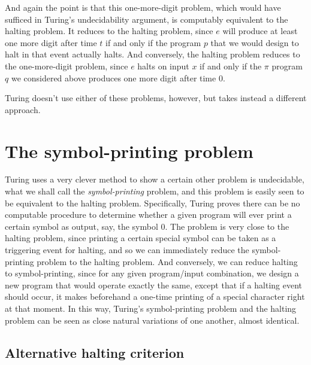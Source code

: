 \documentclass[12pt]{amsart}
\begin{document}
And again the point is that this one-more-digit problem, which would have sufficed in Turing's undecidability argument, is computably equivalent to the halting problem. It reduces to the halting problem, since $e$ will produce at least one more digit after time $t$ if and only if the program $p$ that we would design to halt in that event actually halts. And conversely, the halting problem reduces to the one-more-digit problem, since $e$ halts on input $x$ if and only if the $\pi$ program $q$ we considered above produces one more digit after time $0$.

Turing doesn't use either of these problems, however, but takes instead a different approach.

\section{The symbol-printing problem}\label{Section.Symbol-printing}

Turing uses a very clever method to show a certain other problem is undecidable, what we shall call the \emph{symbol-printing} problem, and this problem is easily seen to be equivalent to the halting problem. Specifically, Turing proves there can be no computable procedure to determine whether a given program will ever print a certain symbol as output, say, the symbol $0$. The problem is very close to the halting problem, since printing a certain special symbol can be taken as a triggering event for halting, and so we can immediately reduce the symbol-printing problem to the halting problem. And conversely, we can reduce halting to symbol-printing, since for any given program/input combination, we design a new program that would operate exactly the same, except that if a halting event should occur, it makes beforehand a one-time printing of a special character right at that moment. In this way, Turing's symbol-printing problem and the halting problem can be seen as close natural variations of one another, almost identical.

\subsection{Alternative halting criterion}
\end{document}
